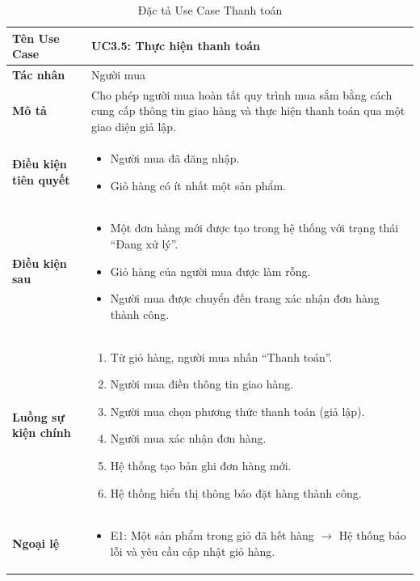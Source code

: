 \begin{table}[H]
\centering
\begin{tabularx}{\textwidth}{|l|X|}
\hline
\textbf{Tên Use Case} & \textbf{UC3.5: Thực hiện thanh toán} \\ \hline
\textbf{Tác nhân} & Người mua \\ \hline
\textbf{Mô tả} & Cho phép người mua hoàn tất quy trình mua sắm bằng cách cung cấp thông tin giao hàng và thực hiện thanh toán qua một giao diện giả lập. \\ \hline
\textbf{Điều kiện tiên quyết} & 
\begin{itemize}
    \item Người mua đã đăng nhập.
    \item Giỏ hàng có ít nhất một sản phẩm.
\end{itemize} \\ \hline
\textbf{Điều kiện sau} & 
\begin{itemize}
    \item Một đơn hàng mới được tạo trong hệ thống với trạng thái ``Đang xử lý''.
    \item Giỏ hàng của người mua được làm rỗng.
    \item Người mua được chuyển đến trang xác nhận đơn hàng thành công.
\end{itemize} \\ \hline
\textbf{Luồng sự kiện chính} & 
\begin{enumerate}
    \item Từ giỏ hàng, người mua nhấn ``Thanh toán''.
    \item Người mua điền thông tin giao hàng.
    \item Người mua chọn phương thức thanh toán (giả lập).
    \item Người mua xác nhận đơn hàng.
    \item Hệ thống tạo bản ghi đơn hàng mới.
    \item Hệ thống hiển thị thông báo đặt hàng thành công.
\end{enumerate} \\ \hline
\textbf{Ngoại lệ} & 
\begin{itemize}
    \item E1: Một sản phẩm trong giỏ đã hết hàng $\rightarrow$ Hệ thống báo lỗi và yêu cầu cập nhật giỏ hàng.
\end{itemize} \\ \hline
\end{tabularx}
\caption{Đặc tả Use Case Thanh toán}
\end{table}

